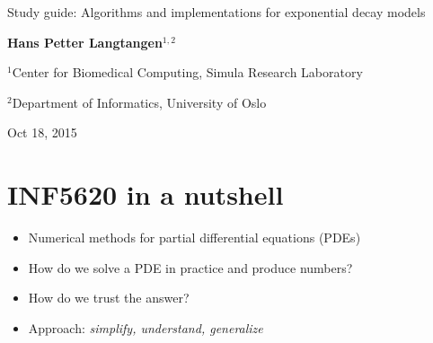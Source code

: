 \documentclass[%
oneside,                 %
final,                   %
10pt]{article}
\begin{document}







\thispagestyle{empty}

\begin{center}
{\LARGE\bf
\begin{spacing}{1.25}
Study guide: Algorithms and implementations for exponential decay models
\end{spacing}
}
\end{center}


\begin{center}
{\bf Hans Petter Langtangen${}^{1, 2}$} \\ [0mm]
\end{center}

\begin{center}
\centerline{{\small ${}^1$Center for Biomedical Computing, Simula Research Laboratory}}
\centerline{{\small ${}^2$Department of Informatics, University of Oslo}}
\end{center}
    

\begin{center}
Oct 18, 2015
\end{center}

\vspace{1cm}


\section*{INF5620 in a nutshell}
\label{5620:about}

\begin{itemize}
 \item Numerical methods for partial differential equations (PDEs)

 \item How do we solve a PDE in practice and produce numbers?

 \item How do we trust the answer?

 \item Approach: \emph{simplify, understand, generalize}
\end{itemize}
\end{document}
